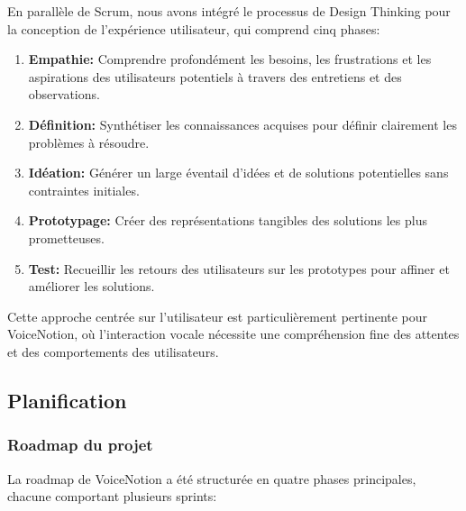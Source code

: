     En parallèle de Scrum, nous avons intégré le processus de Design Thinking pour la conception de l'expérience utilisateur, qui comprend cinq phases:
    
    \begin{enumerate}
        \item \textbf{Empathie:} Comprendre profondément les besoins, les frustrations et les aspirations des utilisateurs potentiels à travers des entretiens et des observations.
        
        \item \textbf{Définition:} Synthétiser les connaissances acquises pour définir clairement les problèmes à résoudre.
        
        \item \textbf{Idéation:} Générer un large éventail d'idées et de solutions potentielles sans contraintes initiales.
        
        \item \textbf{Prototypage:} Créer des représentations tangibles des solutions les plus prometteuses.
        
        \item \textbf{Test:} Recueillir les retours des utilisateurs sur les prototypes pour affiner et améliorer les solutions.
    \end{enumerate}
    
    Cette approche centrée sur l'utilisateur est particulièrement pertinente pour VoiceNotion, où l'interaction vocale nécessite une compréhension fine des attentes et des comportements des utilisateurs.
    
        
    \subsection{Planification}
    
    \subsubsection{Roadmap du projet}
    
    La roadmap de VoiceNotion a été structurée en quatre phases principales, chacune comportant plusieurs sprints:
    
